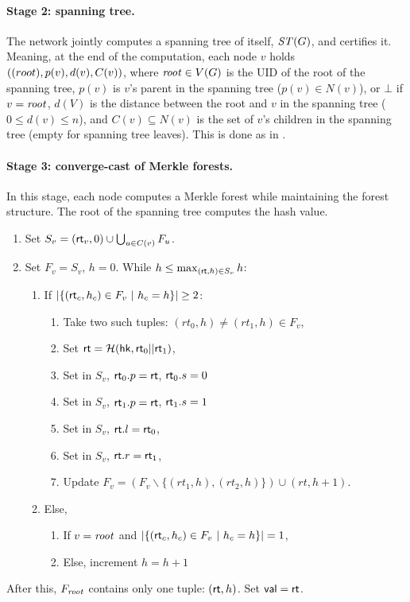 \paragraph{Stage 2: spanning tree. } The network jointly computes a spanning tree of itself, $\mathit{ ST }(G)$, and certifies it. Meaning, at the end of the computation, each node $v$ holds $(\mathit{ ( }root), p(v), d(v), C(v))$, where $\mathit{ root }\in V(G)$ is the UID of the root of the spanning tree, $p(v)$ is $v$'s parent in the spanning tree ($p(v)\in N(v)$), or $\bot$ if $v=\mathit{ root }$, $d(V)$ is the distance between the root and $v$ in the spanning tree ($0 \leq d(v) \leq n$), and $C(v)\subseteq N(v)$ is the set of $v$'s children in the spanning tree (empty for spanning tree leaves). This is done as in \cite{korman2005proof}. 

\paragraph{Stage 3: converge-cast of Merkle forests. } In this stage, each node computes a Merkle forest while maintaining the forest structure. The root of the spanning tree computes the hash value.
\begin{enumerate}
    \item Set $S_v = (\mathsf{rt}_v, 0) \cup \bigcup_{u\in C(v)}F_u$.
    \item Set $F_v = S_v$, $h = 0$. While $h \leq \max_{(\mathsf{rt}, h)\in S_v} h$:
    \begin{enumerate}
        \item If $|\{(\mathsf{rt}_c, h_c)\in F_v ~|~ h_c = h\}| \geq 2$:
        \begin{enumerate}
            \item Take two such tuples: $(rt_0, h) \neq (rt_1, h) \in F_v$,
            \item Set $\mathsf{rt} = \mathcal{H}(\mathsf{hk}, \mathsf{rt}_0 || \mathsf{rt}_1)$,
            \item Set in $S_v$, $\mathsf{rt}_0.p = \mathsf{rt}$, $\mathsf{rt}_0.s = 0$
            \item Set in $S_v$, $\mathsf{rt}_1.p = \mathsf{rt}$, $\mathsf{rt}_1.s = 1$
            \item Set in $S_v$, $\mathsf{rt}.l = \mathsf{rt}_0$,
            \item Set in $S_v$, $\mathsf{rt}.r = \mathsf{rt}_1$,
            \item Update $F_v = (F_v \backslash \{(rt_1, h), (rt_2, h)\}) \cup (rt, h+1)$.
        \end{enumerate}
        \item Else, 
        \begin{enumerate}
            \item If $v = \mathit{ root }$ and $|\{(\mathsf{rt}_c, h_c)\in F_v ~|~ h_c = h\}| = 1$,
            \item Else, increment $h = h+1$
        \end{enumerate}
    \end{enumerate}
\end{enumerate}
After this, $F_{\mathit{ root }}$ contains only one tuple: $(\mathsf{rt}, h)$. Set $\mathsf{val} = \mathsf{rt}$.

